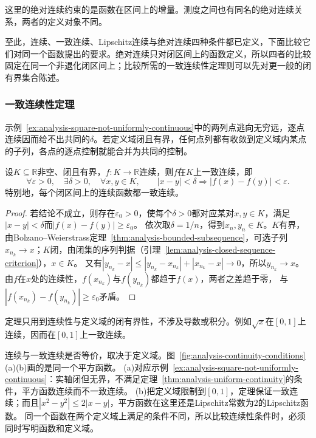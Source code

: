这里的绝对连续约束的是函数在区间上的增量。测度之间也有同名的绝对连续关系，两者的定义对象不同。

至此，连续、一致连续、Lipschitz连续与绝对连续四种条件都已定义，下面比较它们对同一个函数提出的要求。绝对连续只对闭区间上的函数定义，所以四者的比较固定在同一个非退化闭区间上；比较所需的一致连续性定理则可以先对更一般的闭有界集合陈述。

\subsubsection{一致连续性定理}
示例~\ref{ex:analysis-square-not-uniformly-continuous}中的两列点逃向无穷远，逐点连续因而给不出共同的$\delta$。若定义域闭且有界，任何点列都有收敛到定义域内某点的子列，各点的逐点控制就能合并为共同的控制。
\begin{theorem}[闭有界集上的一致连续性定理]
\label{thm:analysis-uniform-continuity}
设$K\subseteq\mathbb R$非空、闭且有界，$f:K\to\mathbb R$连续，则$f$在$K$上一致连续，即
\[
 \forall\varepsilon>0,\quad\exists\delta>0,\quad\forall x,y\in K,\qquad
 |x-y|<\delta\Longrightarrow |f(x)-f(y)|<\varepsilon.
\]
特别地，每个闭区间上的连续函数都一致连续。
\end{theorem}
\begin{proof}
若结论不成立，则存在$\varepsilon_0>0$，使每个$\delta>0$都对应某对$x,y\in K$，满足$|x-y|<\delta$而$|f(x)-f(y)|\geq\varepsilon_0$。
依次取$\delta=1/n$，得到$x_n,y_n\in K$。$K$有界，由Bolzano--Weierstrass定理~\ref{thm:analysis-bounded-subsequence}，可选子列$x_{n_k}\to x$；$K$闭，由闭集的序列判据（引理~\ref{lem:analysis-closed-sequence-criterion}），$x\in K$。
又有$|y_{n_k}-x|\leq|y_{n_k}-x_{n_k}|+|x_{n_k}-x|\to0$，所以$y_{n_k}\to x$。
由$f$在$x$处的连续性，$f(x_{n_k})$与$f(y_{n_k})$都趋于$f(x)$，两者之差趋于零，
与$|f(x_{n_k})-f(y_{n_k})|\geq\varepsilon_0$矛盾。
\end{proof}
定理只用到连续性与定义域的闭有界性，不涉及导数或积分。例如$\sqrt x$在$[0,1]$上连续，因而在$[0,1]$上一致连续。

连续与一致连续是否等价，取决于定义域。图~\ref{fig:analysis-continuity-conditions}(a)(b)画的是同一个平方函数。
(a)对应示例~\ref{ex:analysis-square-not-uniformly-continuous}：实轴闭但无界，不满足定理~\ref{thm:analysis-uniform-continuity}的条件，平方函数连续而不一致连续。
(b)把定义域限制到$[0,1]$，定理保证一致连续；而且$|x^2-y^2|\leq2|x-y|$，平方函数在这里还是Lipschitz常数为$2$的Lipschitz函数。
同一个函数在两个定义域上满足的条件不同，所以比较连续性条件时，必须同时写明函数和定义域。

